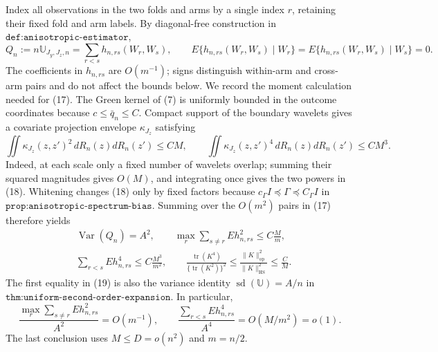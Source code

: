 Index all observations in the two folds and arms by a single index \(r\), retaining their fixed fold and arm labels.  By diagonal-free construction in \(\texttt{def:anisotropic-estimator}\),
\[
Q_n:=n\mathbb U_{J_y,J_z,n}=\sum_{r<s}h_{n,rs}(W_r,W_s),\qquad
E\{h_{n,rs}(W_r,W_s)\mid W_r\}=E\{h_{n,rs}(W_r,W_s)\mid W_s\}=0.
\tag{17}
\]
The coefficients in \(h_{n,rs}\) are \(O(m^{-1})\); signs distinguish within-arm and cross-arm pairs and do not affect the bounds below.  We record the moment calculation needed for (17).  The Green kernel of (7) is uniformly bounded in the outcome coordinates because \(c\le\bar q_n\le C\).  Compact support of the boundary wavelets gives a covariate projection envelope \(\kappa_{J_z}\) satisfying
\[
\iint\kappa_{J_z}(z,z')^2\,dR_n(z)dR_n(z')\le CM,\qquad
\iint\kappa_{J_z}(z,z')^4\,dR_n(z)dR_n(z')\le CM^3.
\tag{18}
\]
Indeed, at each scale only a fixed number of wavelets overlap; summing their squared magnitudes gives \(O(M)\), and integrating once gives the two powers in (18).  Whitening changes (18) only by fixed factors because \(c_\Gamma I\preceq\Gamma\preceq C_\Gamma I\) in \(\texttt{prop:anisotropic-spectrum-bias}\).  Summing over the \(O(m^2)\) pairs in (17) therefore yields
\[
\begin{split}
&\operatorname{Var}(Q_n)=A^2,\qquad
\max_r\sum_{s\ne r}E h_{n,rs}^2\le C\frac{M}{m},\\
&\sum_{r<s}E h_{n,rs}^4\le C\frac{M^3}{m^2},\qquad
\frac{\operatorname{tr}(K^4)}{\{\operatorname{tr}(K^2)\}^2}
\le\frac{\|K\|_{\mathrm{op}}^2}{\|K\|_{\mathrm{HS}}^2}\le\frac CM.
\end{split}
\tag{19}
\]
The first equality in (19) is also the variance identity \(\operatorname{sd}(\mathbb U)=A/n\) in \(\texttt{thm:uniform-second-order-expansion}\).  In particular,
\[
\frac{\max_r\sum_{s\ne r}E h_{n,rs}^2}{A^2}=O(m^{-1}),\qquad
\frac{\sum_{r<s}E h_{n,rs}^4}{A^4}=O(M/m^2)=o(1).
\tag{20}
\]
The last conclusion uses \(M\le D=o(n^2)\) and \(m=n/2\).


